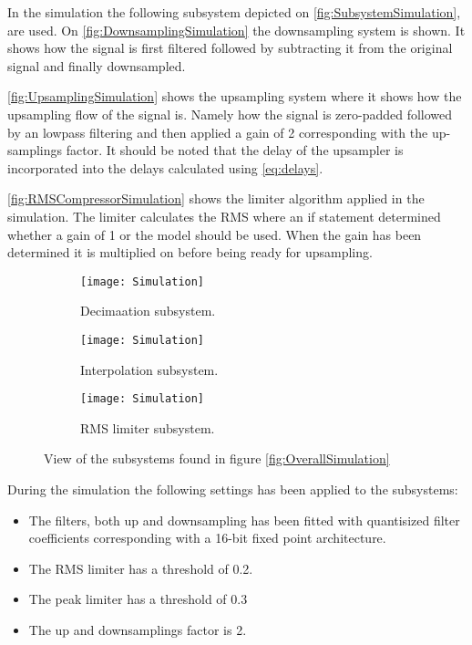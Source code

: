 In the simulation the following subsystem depicted on \autoref{fig:SubsystemSimulation}, are used. On \autoref{fig:DownsamplingSimulation} the downsampling system is shown. It shows how the signal is first filtered followed by subtracting it from the original signal and finally downsampled. 

\autoref{fig:UpsamplingSimulation} shows the upsampling system where it shows how the upsampling flow of the signal is. Namely how the signal is zero-padded followed by an lowpass filtering and then applied a gain of 2 corresponding with the up-samplings factor. It should be noted that the delay of the upsampler is incorporated into the delays calculated using \autoref{eq:delays}.  

\autoref{fig:RMSCompressorSimulation} shows the limiter algorithm applied in the simulation. The limiter calculates the RMS where an if statement determined whether a gain of 1 or the model should be used. When the gain has been determined it is multiplied on before being ready for upsampling. 
\begin{figure}[H]
\centering
\begin{subfigure}[t]{0.49\textwidth}
    \centering
\texttt{[image: Simulation]}
    \caption{Decimaation subsystem.}
    \label{fig:DownsamplingSimulation}
\end{subfigure}
\begin{subfigure}[t]{0.49\textwidth}
    \centering
\texttt{[image: Simulation]}
    \caption{Interpolation subsystem.}
    \label{fig:UpsamplingSimulation}
\end{subfigure}
\begin{subfigure}[t]{\textwidth}
    \centering
\texttt{[image: Simulation]}
    \caption{RMS limiter subsystem.}
    \label{fig:RMSCompressorSimulation}
\end{subfigure}
\label{fig:SubsystemSimulation}
\caption{View of the subsystems found in figure \ref{fig:OverallSimulation}}
\end{figure}


During the simulation the following settings has been applied to the subsystems:
\begin{itemize}
\item The filters, both up and downsampling has been fitted with quantisized filter coefficients corresponding with a 16-bit fixed point architecture.
\item The RMS limiter has a threshold of 0.2. 
\item The peak limiter has a threshold of 0.3
\item The up and downsamplings factor is 2.
\end{itemize}

